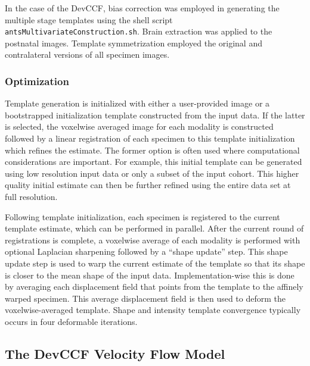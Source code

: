 \documentclass[
  12pt,
]{article}
\begin{document}
In the case of the DevCCF, bias correction was employed in generating
the multiple stage templates using the shell script
\texttt{antsMultivariateConstruction.sh}. Brain extraction was applied
to the postnatal images. Template symmetrization employed the original
and contralateral versions of all specimen images.

\hypertarget{optimization}{%
\subsubsection*{Optimization}\label{optimization}}

Template generation is initialized with either a user-provided image or
a bootstrapped initialization template constructed from the input data.
If the latter is selected, the voxelwise averaged image for each
modality is constructed followed by a linear registration of each
specimen to this template initialization which refines the estimate. The
former option is often used where computational considerations are
important. For example, this initial template can be generated using low
resolution input data or only a subset of the input cohort. This higher
quality initial estimate can then be further refined using the entire
data set at full resolution.

Following template initialization, each specimen is registered to the
current template estimate, which can be performed in parallel. After the
current round of registrations is complete, a voxelwise average of each
modality is performed with optional Laplacian sharpening followed by a
``shape update'' step. This shape update step is used to warp the
current estimate of the template so that its shape is closer to the mean
shape of the input data. Implementation-wise this is done by averaging
each displacement field that points from the template to the affinely
warped specimen. This average displacement field is then used to deform
the voxelwise-averaged template. Shape and intensity template
convergence typically occurs in four deformable iterations.

\hypertarget{the-devccf-velocity-flow-model}{%
\subsection*{The DevCCF Velocity Flow
Model}\label{the-devccf-velocity-flow-model}}
\end{document}
